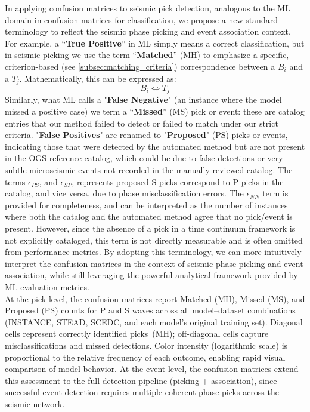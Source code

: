 In applying confusion matrices to seismic pick detection, analogous to the
\ac{ML} domain in confusion matrices for classification, we propose a new
standard terminology to reflect the seismic phase picking and event association
context. For example, a “\textbf{True Positive}” in ML simply means a correct
classification, but in seismic picking we use the term “\textbf{Matched}” (MH)
to emphasize a specific, criterion-based (see \ref{subsec:matching_criteria})
correspondence between a $B_i$ and a $T_j$. Mathematically, this can be
expressed as:
$$B_i \Leftrightarrow T_j$$
Similarly, what ML calls a "\textbf{False Negative}" (an instance where the
model missed a positive case) we term a “\textbf{Missed}” (MS) pick or event:
these are catalog entries that our method failed to detect or failed to match
under our strict criteria. "\textbf{False Positives}" are renamed to
"\textbf{Proposed}" (PS) picks or events, indicating those that were detected
by the automated method but are not present in the OGS reference catalog, which
could be due to false detections or very subtle microseismic events not
recorded in the manually reviewed catalog. The terms $\epsilon_{PS}$, and
$\epsilon_{SP}$, represents proposed S picks correspond to P picks in the
catalog, and vice versa, due to phase misclassification errors. The
$\epsilon_{NN}$ term is provided for completeness, and can be interpreted as
the number of instances where both the catalog and the automated method agree
that no pick/event is present. However, since the absence of a pick in a time
continuum framework is not explicitly cataloged, this term is not directly
measurable and is often omitted from performance metrics. By adopting this
terminology, we can more intuitively interpret the confusion matrices in the
context of seismic phase picking and event association, while still leveraging
the powerful analytical framework provided by \ac{ML} evaluation metrics.\\

At the pick level, the confusion matrices report Matched (MH), Missed (MS), and
Proposed (PS) counts for P and S waves across all model--dataset combinations
(INSTANCE, STEAD, SCEDC, and each model's original training set). Diagonal
cells represent correctly identified picks~(MH); off-diagonal cells capture
misclassifications and missed detections. Color intensity (logarithmic scale)
is proportional to the relative frequency of each outcome, enabling rapid
visual comparison of model behavior. At the event level, the confusion matrices
extend this assessment to the full detection pipeline (picking + association),
since successful event detection requires multiple coherent phase picks across
the seismic network.

